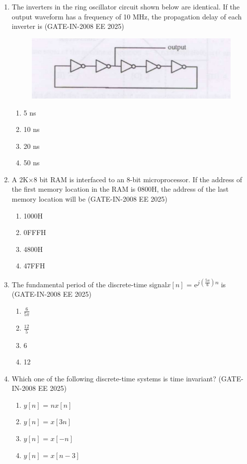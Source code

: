 \documentclass[journal,12pt,onecolumn]{IEEEtran}
\theoremstyle{remark}
\begin{document}
\begin{enumerate}[label=Q.\arabic*,start=1]
    \item The inverters in the ring oscillator circuit shown below are identical. If the output waveform has a
frequency of 10 MHz, the propagation delay of each inverter is (GATE-IN-2008 EE 2025)
\begin{figure}[H]
    \centering
    \includegraphics[width=0.5\linewidth]{figs/i4.jpg}
    \label{fig:placeholder4}
\end{figure}
    \begin{enumerate} 
        \item 5 ns
        \item 10 ns
        \item 20 ns
        \item 50 ns
    \end{enumerate}
    
    \item A 2K$\times$8 bit RAM is interfaced to an 8-bit microprocessor. If the address of the first memory location in the RAM is 0800H, the address of the last memory location will be (GATE-IN-2008 EE 2025)
    \begin{enumerate} 
        \item 1000H
        \item 0FFFH
        \item 4800H 
        \item 47FFH
    \end{enumerate}
    
    \item  The fundamental period of the discrete-time signal$x[n]$ = e\textsuperscript{$j(\frac{5\pi}{6})n$} is  (GATE-IN-2008 EE 2025)
    \begin{enumerate} 
        \item $\frac{6}{5\pi}$
        \item $\frac{12}{5}$
        \item 6
        \item 12
    \end{enumerate}
    
    \item  Which one of the following discrete-time systems is time invariant? (GATE-IN-2008 EE 2025)
    \begin{enumerate} 
        \item $y[n]$ = $nx[n]$
        \item $y[n]$ = $x[3n]$
        \item $y[n]$ = $x[-n]$
        \item $y[n]$ = $x[n-3]$
    \end{enumerate}
    

\end{enumerate}
\end{document}
